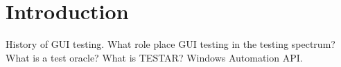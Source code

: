 \section{Introduction}

History of GUI testing.
What role place GUI testing in the testing spectrum?
What is a test oracle?
What is TESTAR?
Windows Automation API.